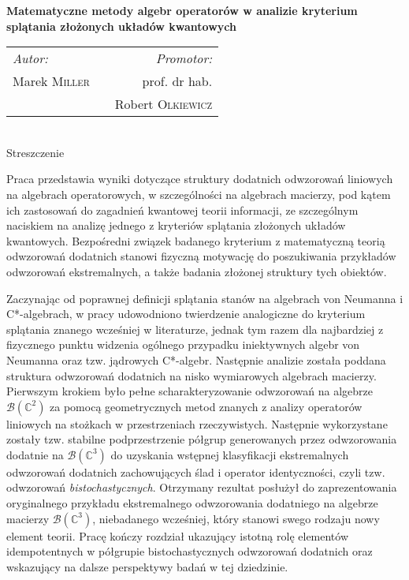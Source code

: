 \thispagestyle{empty}

\begin{center}
{ \large \bfseries
    Matematyczne metody algebr operatorów
    w analizie kryterium splątania
    złożonych układów kwantowych
}\\[1.5cm]

{
\begin{tabular}{lcr}
\emph{Autor:} & \hspace{3cm} & \emph{Promotor:}\\
Marek \textsc{Miller} & & prof. dr hab. \\
    & & Robert \textsc{Olkiewicz}
\end{tabular}
}
\\[1cm]
Streszczenie\\[0.5cm]
\end{center}

{
Praca przedstawia wyniki dotyczące struktury dodatnich odwzorowań liniowych
na algebrach operatorowych, w szczególności na algebrach macierzy,
pod kątem ich zastosowań do zagadnień kwantowej teorii informacji,
ze szczególnym naciskiem na analizę jednego z kryteriów splątania złożonych
układów kwantowych.
Bezpośredni związek badanego kryterium z matematyczną teorią odwzorowań dodatnich
stanowi fizyczną motywację do poszukiwania przykładów odwzorowań ekstremalnych,
a także badania złożonej struktury tych obiektów.

Zaczynając od poprawnej definicji splątania stanów na algebrach von Neumanna
i C*-algebrach,
w pracy udowodniono twierdzenie analogiczne do kryterium splątania
znanego wcześniej w literaturze, jednak tym razem dla najbardziej
z fizycznego punktu widzenia ogólnego przypadku iniektywnych algebr
von Neumanna oraz tzw. jądrowych C*-algebr.
Następnie analizie została poddana struktura odwzorowań dodatnich na
nisko wymiarowych algebrach macierzy.
Pierwszym krokiem było pełne scharakteryzowanie odwzorowań na algebrze
$\mathcal{B}(\mathbb{C}^{2})$ za pomocą geometrycznych metod znanych z analizy
operatorów liniowych na stożkach w przestrzeniach rzeczywistych.
Następnie wykorzystane zostały tzw. stabilne podprzestrzenie półgrup
generowanych przez odwzorowania dodatnie na
$\mathcal{B}(\mathbb{C}^{3})$ do uzyskania
wstępnej klasyfikacji ekstremalnych odwzorowań dodatnich
zachowujących ślad i operator identyczności,
czyli tzw. odwzorowań \emph{bistochastycznych}.
Otrzymany rezultat posłużył do zaprezentowania oryginalnego przykładu
ekstremalnego odwzorowania dodatniego na algebrze macierzy
$\mathcal{B}(\mathbb{C}^{3})$, niebadanego wcześniej,
który stanowi swego rodzaju nowy element teorii.
Pracę kończy rozdział
ukazujący istotną rolę elementów idempotentnych w półgrupie bistochastycznych
odwzorowań dodatnich oraz wskazujący na dalsze perspektywy badań w tej dziedzinie.
}
\vfill
